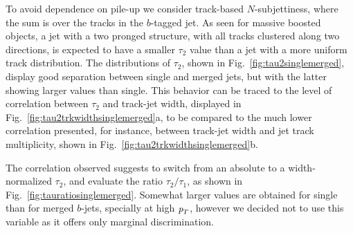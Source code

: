 


To avoid dependence on pile-up we consider track-based $N$-subjettiness, where the sum 
 is over the tracks in the $b$-tagged jet. As seen for massive boosted objects, a jet with a two pronged structure, with all tracks clustered along two directions, is expected to have a smaller $\tau_2$ value than a jet with a more uniform track distribution. The distributions of $\tau_2$, shown in Fig.~\ref{fig:tau2singlemerged}, display good separation between single and merged jets, but with the latter showing larger values than single. 
This behavior can be traced to the level of correlation between $\tau_2$ and track-jet width, displayed in Fig.~\ref{fig:tau2trkwidthsinglemerged}a, to be compared to the much lower correlation presented, for instance, between track-jet width and jet track multiplicity, shown in  Fig.~\ref{fig:tau2trkwidthsinglemerged}b. 

The correlation observed suggests to switch from an absolute to a width-normalized $\tau_2$, and evaluate the ratio $\tau_2/\tau_1$, as shown in  Fig.~\ref{fig:tauratiosinglemerged}. %
Somewhat larger values are obtained for single than for merged $b$-jets, specially at high ${\emph{p}_{T}}$, however we decided not to use this variable as it offers only marginal discrimination. 


